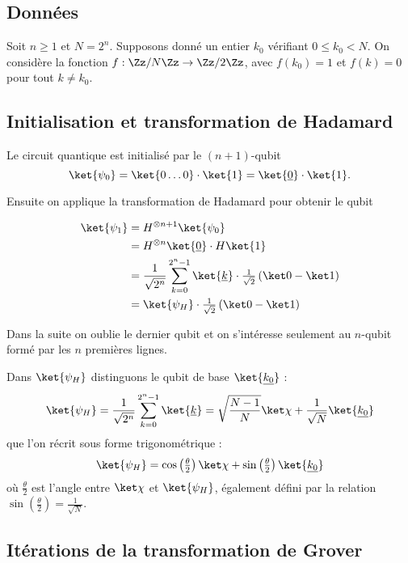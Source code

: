 \documentclass[11pt,class=report,crop=false]{standalone}
\begin{document}
\subsection{Données}

Soit $n\ge1$ et $N=2^n$. 
Supposons donné un entier $k_0$ vérifiant $0\le k_0 < N$.
On considère la fonction $f : \Zz/N\Zz \to \Zz/2\Zz$, avec $f(k_0)=1$ et
$f(k)=0$ pour tout $k\neq k_0$.

\subsection{Initialisation et transformation de Hadamard}

Le circuit quantique est initialisé par le $(n+1)$-qubit
$$\ket{\psi_0} = \ket{0\ldots0} \cdot \ket{1} 
= \ket{\underline{0}} \cdot \ket{1}.$$

Ensuite on applique la transformation de Hadamard pour obtenir le qubit 

\begin{align*}
\ket{\psi_1} 
  &= H^{\otimes n+1} \ket{\psi_0} \\
  &= H^{\otimes n}\ket{\underline{0}} \cdot H\ket{1} \\
  &= \frac{1}{\sqrt{2^n}} \sum_{k=0}^{2^n-1} \ket{\underline k} \cdot \tfrac{1}{\sqrt{2}}\left(\ket0 - \ket1\right) \\
  &= \ket{\psi_H} \cdot \tfrac{1}{\sqrt{2}}\left(\ket0 - \ket1\right)
\end{align*}

Dans la suite on oublie le dernier qubit et on s'intéresse seulement au $n$-qubit formé par les $n$ premières lignes.

Dans $\ket{\psi_H}$ distinguons le qubit de base $\ket{\underline{k_0}}$ :
$$\ket{\psi_H} = \frac{1}{\sqrt{2^n}} \sum_{k=0}^{2^n-1} \ket{\underline{k}}
= \sqrt{\frac{N-1}{N}} \ket\chi + \frac{1}{\sqrt{N}} \ket{\underline{k_0}}$$
que l'on récrit sous forme trigonométrique :
$$\ket{\psi_H} = \cos\left(\tfrac\theta2\right) \ket\chi + \sin\left(\tfrac\theta2\right) \ket{\underline{k_0}}$$
où $\frac\theta2$ est l'angle entre $\ket\chi$ et $\ket{\psi_H}$, également défini par la relation $\sin\left(\frac\theta2\right)=\frac{1}{\sqrt{N}}$.

\subsection{Itérations de la transformation de Grover}
\end{document}

